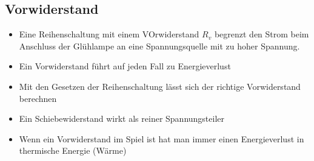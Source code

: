 \documentclass[../../main.tex]{subfiles}
\begin{document}
\subsection{Vorwiderstand}
\begin{itemize}
    \item Eine Reihenschaltung mit einem VOrwiderstand $R_v$ begrenzt den Strom beim Anschluss der Glühlampe an eine Spannungsquelle mit zu hoher Spannung.
    \item Ein Vorwiderstand führt auf jeden Fall zu Energieverlust
    \item Mit den Gesetzen der Reihenschaltung lässt sich der richtige Vorwiderstand berechnen
    \item Ein Schiebewiderstand wirkt als reiner Spannungsteiler
    \item Wenn ein Vorwiderstand im Spiel ist hat man immer einen Energieverlust in thermische Energie (Wärme)
\end{itemize}
\end{document}
